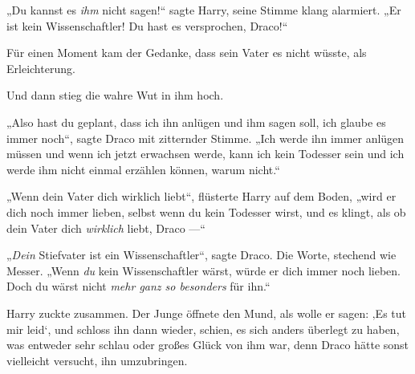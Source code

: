 „Du kannst es \emph{ihm} nicht sagen!“ sagte Harry, seine Stimme klang alarmiert.
„Er ist kein Wissenschaftler! Du hast es versprochen, Draco!“

Für einen Moment kam der Gedanke, dass sein Vater es nicht wüsste, als Erleichterung.

Und dann stieg die wahre Wut in ihm hoch.

„Also hast du geplant, dass ich ihn anlügen und ihm sagen soll, ich glaube es immer noch“, sagte Draco mit zitternder Stimme.
„Ich werde ihn immer anlügen müssen und wenn ich jetzt erwachsen werde, kann ich kein Todesser sein und ich werde ihm nicht einmal erzählen können, warum nicht.“

„Wenn dein Vater dich wirklich liebt“, flüsterte Harry auf dem Boden, „wird er dich noch immer lieben, selbst wenn du kein Todesser wirst, und es klingt, als ob dein Vater dich \emph{wirklich} liebt, Draco —“

„\emph{Dein} Stiefvater ist ein Wissenschaftler“, sagte Draco. Die Worte, stechend wie Messer.
„Wenn \emph{du} kein Wissenschaftler wärst, würde er dich immer noch lieben. Doch du wärst nicht \emph{mehr ganz so besonders} für ihn.“

Harry zuckte zusammen. Der Junge öffnete den Mund, als wolle er sagen: ‚Es tut mir leid‘, und schloss ihn dann wieder, schien, es sich anders überlegt zu haben, was entweder sehr schlau oder großes Glück von ihm war, denn Draco hätte sonst vielleicht versucht, ihn umzubringen.


